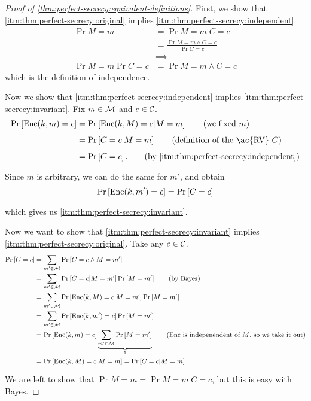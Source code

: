 \begin{proof}[Proof of \cref{thm:perfect-secrecy:equivalent-definitions}]
	First, we show that \ref{itm:thm:perfect-secrecy:original} implies \ref{itm:thm:perfect-secrecy:independent}.
	\begin{align*}
		\Pr{M=m} & = \Pr{M = m | C = c} \\
		& = \frac{\Pr{M = m \land C = c}}{\Pr{C = c}} \tag{by Bayes}
		\\
		& \implies \\
		\Pr{M = m} \Pr{C = c}
		& =
		\Pr{M = m \land C = c}
	\end{align*}
	which is the definition of independence.

	Now we show that \ref{itm:thm:perfect-secrecy:independent} implies \ref{itm:thm:perfect-secrecy:invariant}.
	Fix $m \in \mathcal{M}$ and $c \in \mathcal{C}$.
	\begin{align*}
		\Pr{\GenericEnc(k, m) = c} 
		& =
		\Pr{\GenericEnc(k, M) = c | M = m} \tag{we fixed $m$}
		\\
		& = \Pr{C = c | M = m} \tag{definition of the \ac{RV} $C$}
		\\
		& = \Pr{C = c}. \tag{by \ref{itm:thm:perfect-secrecy:independent}}
	\end{align*}
	Since $m$ is arbitrary, we can do the same for $m'$, and obtain
	\begin{equation*}
		\mathop{\mathrm{Pr}}\limits_{} \left[ {\mathrm{Enc}(k,m') = c} \right] = \mathop{\mathrm{Pr}}\limits_{} \left[ {C = c} \right]
	\end{equation*}
	which gives us \ref{itm:thm:perfect-secrecy:invariant}.

	Now we want to show that \ref{itm:thm:perfect-secrecy:invariant} implies \ref{itm:thm:perfect-secrecy:original}.
	Take any $c \in \mathcal{C}$.
	\begin{align*}
		\Pr{C = c}
		& =
		\sum_{m' \in \M} \Pr{C = c \land M = m'}
		\\
		& = 
		\sum_{m' \in \M} \Pr{C = c | M = m'} \Pr{M = m'}
		\tag{by Bayes}
		\\
		& =
		\sum_{m' \in \M} \Pr{\GenericEnc(k,M) = c | M = m'} \Pr{M = m'}
		\\
		& =
		\sum_{m' \in \M} \Pr{\GenericEnc(k,m') = c} \Pr{M = m'}
		\\
		& =
		\Pr{\GenericEnc(k, m) = c} \underbrace{\sum_{m' \in \M} \Pr{M = m'}}_{1}
		\tag{$\GenericEnc$ is indepenendent of $M$, so we take it out}
		\\
		& =
		\Pr{\GenericEnc(k,M) = c | M = m} =
		\Pr{C = c | M = m}.
	\end{align*}
	We are left to show that $\Pr{M = m} = \Pr{M = m | C = c}$, but this is easy with Bayes.
\end{proof}

